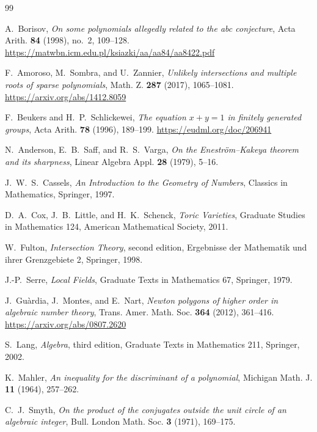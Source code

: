 \documentclass[11pt]{article}
\numberwithin{equation}{section}
\theoremstyle{definition}
\begin{document}
\begin{thebibliography}{99}

A.~Borisov,
\emph{On some polynomials allegedly related to the abc conjecture},
Acta Arith. \textbf{84} (1998), no.~2, 109--128.
\url{https://matwbn.icm.edu.pl/ksiazki/aa/aa84/aa8422.pdf}


F.~Amoroso, M.~Sombra, and U.~Zannier,
\emph{Unlikely intersections and multiple roots of sparse polynomials},
Math. Z. \textbf{287} (2017), 1065--1081.
\url{https://arxiv.org/abs/1412.8059}

F.~Beukers and H.~P.~Schlickewei,
\emph{The equation \(x+y=1\) in finitely generated groups},
Acta Arith. \textbf{78} (1996), 189--199.
\url{https://eudml.org/doc/206941}

N.~Anderson, E.~B.~Saff, and R.~S.~Varga,
\emph{On the Enestr\"om--Kakeya theorem and its sharpness},
Linear Algebra Appl. \textbf{28} (1979), 5--16.

J.~W.~S.~Cassels,
\emph{An Introduction to the Geometry of Numbers},
Classics in Mathematics, Springer, 1997.

D.~A.~Cox, J.~B.~Little, and H.~K.~Schenck,
\emph{Toric Varieties},
Graduate Studies in Mathematics 124, American Mathematical Society, 2011.

W.~Fulton,
\emph{Intersection Theory}, second edition,
Ergebnisse der Mathematik und ihrer Grenzgebiete 2,
Springer, 1998.

J.-P.~Serre,
\emph{Local Fields},
Graduate Texts in Mathematics 67, Springer, 1979.

J.~Gu\`ardia, J.~Montes, and E.~Nart,
\emph{Newton polygons of higher order in algebraic number theory},
Trans. Amer. Math. Soc. \textbf{364} (2012), 361--416.
\url{https://arxiv.org/abs/0807.2620}

S.~Lang,
\emph{Algebra}, third edition,
Graduate Texts in Mathematics 211, Springer, 2002.

K.~Mahler,
\emph{An inequality for the discriminant of a polynomial},
Michigan Math. J. \textbf{11} (1964), 257--262.

C.~J.~Smyth,
\emph{On the product of the conjugates outside the unit circle of an
algebraic integer},
Bull. London Math. Soc. \textbf{3} (1971), 169--175.

\end{thebibliography}
\end{document}
